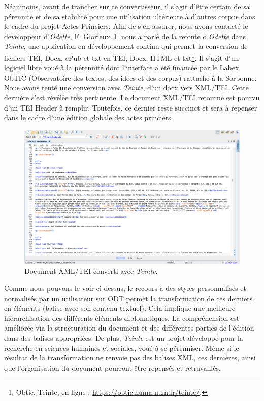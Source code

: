 \newpage 

\par Néanmoins, avant de trancher sur ce convertisseur, il s’agit d’être certain de sa pérennité et de sa stabilité pour une utilisation ultérieure à d’autres corpus dans le cadre du projet Actes Princiers. Afin de s’en assurer, nous avons contacté le développeur d'\textit{Odette}, F. Glorieux. Il nous a parlé de la refonte d'\textit{Odette} dans \textit{Teinte}, une application en développement continu qui permet la conversion de fichiers TEI, Docx, ePub et txt en TEI, Docx, HTML et txt\footnote{Obtic, Teinte, en ligne : \url{https://obtic.huma-num.fr/teinte/}.}. Il s’agit d’un logiciel libre voué à la pérennité dont l'interface a été financée par le Labex ObTIC (Observatoire des textes, des idées et des corpus) rattaché à la Sorbonne. Nous avons tenté une conversion avec \textit{Teinte}, d’un docx vers XML/TEI. Cette dernière s’est révélée très pertinente. Le document XML/TEI retourné est pourvu d’un TEI Header à remplir. Toutefois, ce dernier reste succinct et sera à repenser dans le cadre d’une édition globale des actes princiers. 

\begin{figure}[ht!]
    \centering
    \includegraphics[scale=0.31]{front/images/teinte.png}
    \caption{Document XML/TEI converti avec \textit{Teinte}.}
    \label{fig:teinte}
\end{figure}

\par Comme nous pouvons le voir ci-dessus, le recours à des styles personnalisés et normalisés par un utilisateur sur ODT permet la transformation de ces derniers en éléments (balise avec son contenu textuel). Cela implique une meilleure hiérarchisation des différents éléments diplomatiques. La compréhension est améliorée via la structuration du document et des différentes parties de l'édition dans des balises appropriées. De plus, \textit{Teinte} est un projet développé pour la recherche en sciences humaines et sociales, voué à se pérenniser. Même si le résultat de la transformation ne renvoie pas des balises XML, ces dernières, ainsi que l'organisation du document pourront être repensés et retravaillés. 

\newpage
\thispagestyle{empty}
\mbox{}
\newpage